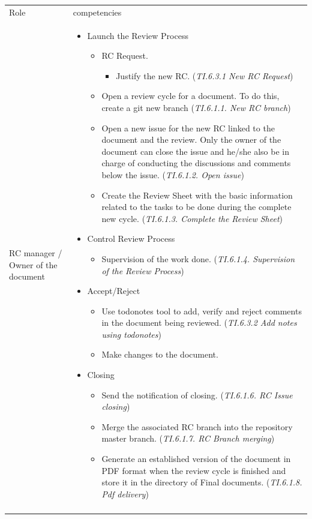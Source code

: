 \documentclass{template/openetcs_article}
\begin{document}
\begin{flushleft}

\begin{tabular}{|m{3cm}|m{11cm}|}
\hline
\rowcolor{myblue}
\multicolumn{2}{|c|}{Roles} \\\hline
\rowcolor{lightgray}
Role &
competencies \\\hline
RC manager / Owner of the document &
\begin{itemize}
\item Launch the Review Process
\begin{itemize}
\item RC Request.
\begin{itemize}
\item Justify the new RC. ({\it TI.6.3.1 New RC Request})
\end{itemize}
\item Open a review cycle for a document. To do this, create a git new branch ({\it TI.6.1.1. New RC branch}) 
\item Open a new issue for the new RC linked to the document and the review. Only the owner of the document can close the issue and he/she also be in charge of conducting the discussions and comments below the issue.  ({\it TI.6.1.2. Open issue})
\item Create the Review Sheet with the basic information related to the tasks to be done during the complete new cycle. ({\it TI.6.1.3. Complete the Review Sheet})
\end{itemize}
\item Control Review Process
\begin{itemize}
\item Supervision of the work done. ({\it TI.6.1.4. Supervision of the Review Process})
\end{itemize}
\item Accept/Reject
\begin{itemize}
\item Use todonotes tool to add, verify and reject comments in the document being reviewed. ({\it TI.6.3.2 Add notes using todonotes})
\item Make changes to the document.
\end{itemize}
\item Closing
\begin{itemize}
\item Send the notification of closing. ({\it TI.6.1.6. RC Issue closing})
\item Merge the associated RC branch into the repository master branch. ({\it TI.6.1.7. RC Branch merging})
\item Generate an established version of the document in PDF format when the review cycle is finished and store it in the directory of Final documents. ({\it TI.6.1.8. Pdf delivery})
\end{itemize}
\end{itemize}
\\\\\hline
\end{tabular}
\end{flushleft}
\end{document}
